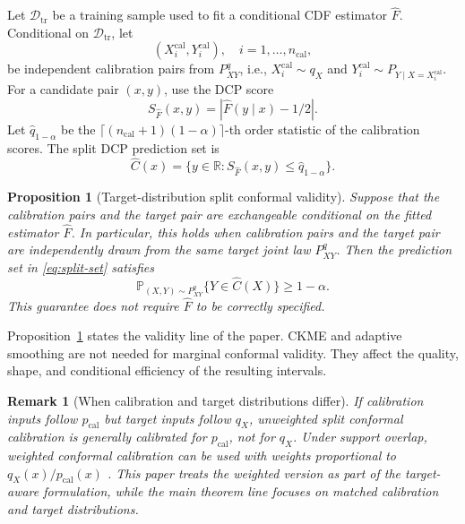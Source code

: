 \documentclass[11pt]{article}
\newtheorem{proposition}{Proposition}
\newtheorem{remark}{Remark}
\newcommand{\Dcal}{\mathcal D}
\newcommand{\Pp}{\mathbb P}
\newcommand{\R}{\mathbb R}
\newcommand{\abs}[1]{\left\lvert #1 \right\rvert}
\begin{document}
Let \(\Dcal_{\mathrm{tr}}\) be a training sample used to fit a conditional CDF estimator \(\widehat F\). Conditional on \(\Dcal_{\mathrm{tr}}\), let
\[
  (X_i^{\mathrm{cal}},Y_i^{\mathrm{cal}}),\quad i=1,\ldots,n_{\mathrm{cal}},
\]
be independent calibration pairs from \(P^q_{XY}\), i.e., \(X_i^{\mathrm{cal}}\sim q_X\) and \(Y_i^{\mathrm{cal}}\sim P_{Y\mid X=X_i^{\mathrm{cal}}}\). For a candidate pair \((x,y)\), use the DCP score
\begin{equation}
  S_{\widehat F}(x,y)=\abs{\widehat F(y\mid x)-1/2}.
  \label{eq:dcp-score}
\end{equation}
Let \(\widehat q_{1-\alpha}\) be the \(\lceil(n_{\mathrm{cal}}+1)(1-\alpha)\rceil\)-th order statistic of the calibration scores. The split DCP prediction set is
\begin{equation}
  \widehat C(x)=\{y\in\R:S_{\widehat F}(x,y)\le \widehat q_{1-\alpha}\}.
  \label{eq:split-set}
\end{equation}

\begin{proposition}[Target-distribution split conformal validity]
\label{prop:target-validity}
Suppose that the calibration pairs and the target pair are exchangeable conditional on the fitted estimator \(\widehat F\). In particular, this holds when calibration pairs and the target pair are independently drawn from the same target joint law \(P^q_{XY}\). Then the prediction set in \eqref{eq:split-set} satisfies
\[
  \Pp_{(X,Y)\sim P^q_{XY}}\{Y\in \widehat C(X)\}\ge 1-\alpha .
\]
This guarantee does not require \(\widehat F\) to be correctly specified.
\end{proposition}

Proposition~\ref{prop:target-validity} states the validity line of the paper. CKME and adaptive smoothing are not needed for marginal conformal validity. They affect the quality, shape, and conditional efficiency of the resulting intervals.

\begin{remark}[When calibration and target distributions differ]
If calibration inputs follow \(p_{\mathrm{cal}}\) but target inputs follow \(q_X\), unweighted split conformal calibration is generally calibrated for \(p_{\mathrm{cal}}\), not for \(q_X\). Under support overlap, weighted conformal calibration can be used with weights proportional to \(q_X(x)/p_{\mathrm{cal}}(x)\) \cite{tibshirani2019}. This paper treats the weighted version as part of the target-aware formulation, while the main theorem line focuses on matched calibration and target distributions.
\end{remark}
\end{document}
